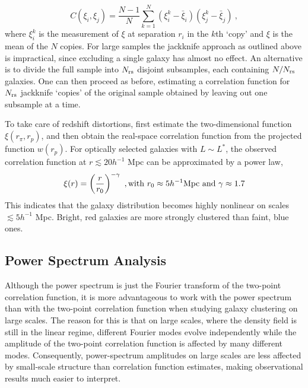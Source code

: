 \documentclass[12pt,a4paper]{article}
\begin{document}
\begin{equation}
C(\xi_i, \xi_j) = \frac{N-1}{N} \sum_{k=1}^{N} (\xi_i^k -\bar{\xi}_i) (\xi_j^k -\bar{\xi}_j) ~,
\end{equation}
where $\xi_i^k$ is the measurement of $\xi$ at separation $r_i$ in the $k$th `copy' and $\xi$ is the mean of the $N$ copies. For large samples the jackknife approach as outlined above is impractical, since excluding a single galaxy has almost no effect. An alternative is to divide the full sample into $N_{\rm rs}$ disjoint subsamples, each containing $N/N_{\rm rs}$ galaxies. One can then proceed as before, estimating a correlation function for $N_{\rm rs}$ jackknife ‘copies’ of the original sample obtained by leaving out one subsample at a time.


To take care of redshift distortions, first estimate the two-dimensional function $\xi(r_\pi,r_p)$, and then obtain the real-space correlation function from the projected function $w(r_p)$. For optically selected galaxies with $L \sim L^\ast$, the observed correlation function at $r \lesssim 20 h^{-1}$ Mpc can be approximated by a power law,
\begin{equation}
\xi(r) = \left(\frac{r}{r_0} \right)^{-\gamma} ~, {\rm with} ~r_0 \approx 5 h^{-1} {\rm Mpc ~and}~ \gamma \approx 1.7
\end{equation}
This indicates that the galaxy distribution becomes highly nonlinear on scales $\lesssim 5 h^{-1}$ Mpc. Bright, red galaxies are more strongly clustered than faint, blue ones.











\subsection{Power Spectrum Analysis}
\cite{2010gfe..book.....M} Although the power spectrum is just the Fourier transform of the two-point correlation function, it is more advantageous to work with the power spectrum than with the two-point correlation function when studying galaxy clustering on large scales. The reason for this is that on large scales, where the density field is still in the linear regime, different Fourier modes evolve independently while the amplitude of the two-point correlation function is affected by many different modes. Consequently, power-spectrum amplitudes on large scales are less affected by small-scale structure than correlation function estimates, making observational results much easier to interpret.
\end{document}
